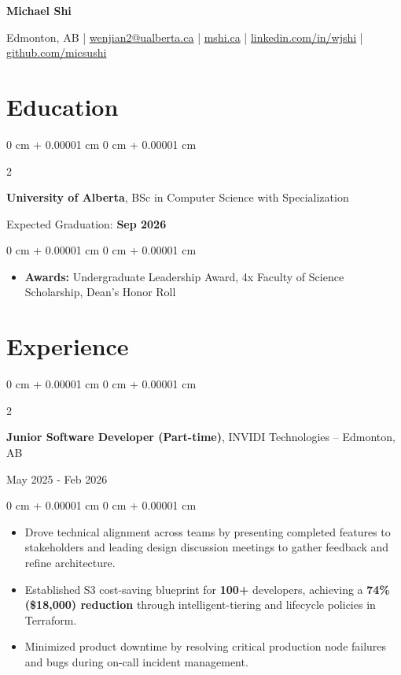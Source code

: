 \documentclass[10pt, letterpaper]{article}
\newenvironment{onecolentry}{
    \begin{adjustwidth}{
        0 cm + 0.00001 cm
    }{
        0 cm + 0.00001 cm
    }
}{
    \end{adjustwidth}
}
\newenvironment{twocolentry}[2][]{
    \onecolentry
    \def\secondColumn{#2}
    \setcolumnwidth{\fill, 6 cm}
    \begin{paracol}{2}
}{
    \switchcolumn \raggedleft \secondColumn
    \end{paracol}
    \endonecolentry
}
\begin{document}
    \begin{center}
        {\fontsize{24pt}{24pt}\selectfont\textbf{Michael Shi}}

        \vspace{0.2cm}

        Edmonton, AB | \href{mailto:wenjian2@ualberta.ca}{wenjian2@ualberta.ca} | \href{https://mshi.ca}{mshi.ca} | \href{https://linkedin.com/in/wjshi}{linkedin.com/in/wjshi} | \href{https://github.com/micsushi}{github.com/micsushi}
    \end{center}

    \vspace{0.10 cm}
    \section{Education}

    \begin{twocolentry}{Expected Graduation: \textbf{Sep 2026}}
        \textbf{University of Alberta}, BSc in Computer Science with Specialization
    \end{twocolentry}

    \vspace{0.10 cm}
    \begin{onecolentry}
        \begin{itemize}[leftmargin=2em, itemsep=1pt, parsep=0pt, topsep=0pt, partopsep=0pt]
            \item \textbf{Awards:} Undergraduate Leadership Award, 4x Faculty of Science Scholarship, Dean's Honor Roll
        \end{itemize}
    \end{onecolentry}

    \vspace{0.10 cm}
    \section{Experience}


    \begin{twocolentry}{May 2025 - Feb 2026}
        \textbf{Junior Software Developer (Part-time)}, INVIDI Technologies -- Edmonton, AB
    \end{twocolentry}

    \vspace{0.10 cm}
    \begin{onecolentry}
        \begin{itemize}[leftmargin=2em, itemsep=1pt, parsep=0pt, topsep=0pt, partopsep=0pt]
            \item Drove technical alignment across teams by presenting completed features to stakeholders and leading design discussion meetings to gather feedback and refine architecture.
            \item Established S3 cost-saving blueprint for \textbf{100+} developers, achieving a \textbf{74\% (\$18,000) reduction} through intelligent-tiering and lifecycle policies in Terraform.
            \item Minimized product downtime by resolving critical production node failures and bugs during on-call incident management.
        \end{itemize}
    \end{onecolentry}
\end{document}
